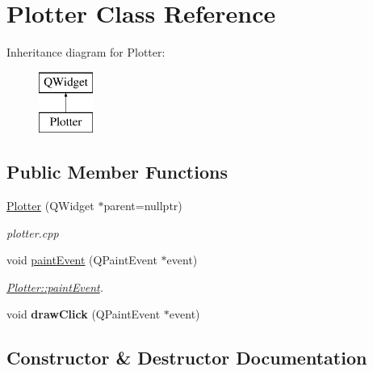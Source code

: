 \hypertarget{classPlotter}{}\section{Plotter Class Reference}
\label{classPlotter}
Inheritance diagram for Plotter\+:\begin{figure}[H]
\begin{center}
\leavevmode
\includegraphics[height=2.000000cm]{classPlotter}
\end{center}
\end{figure}
\subsection*{Public Member Functions}
\begin{DoxyCompactItemize}
\item 
\mbox{\hyperlink{classPlotter_a1807627530de30ae58dff3c42a823497}{Plotter}} (Q\+Widget $\ast$parent=nullptr)
\begin{DoxyCompactList}\small\item\em plotter.\+cpp \end{DoxyCompactList}\item 
void \mbox{\hyperlink{classPlotter_a06477bf987646f000a8982db1352a11d}{paint\+Event}} (Q\+Paint\+Event $\ast$event)
\begin{DoxyCompactList}\small\item\em \mbox{\hyperlink{classPlotter_a06477bf987646f000a8982db1352a11d}{Plotter\+::paint\+Event}}. \end{DoxyCompactList}\item 
\mbox{\label{classPlotter_a237062ad0a0bd6462afd77ff111122b5}} 
void {\bfseries draw\+Click} (Q\+Paint\+Event $\ast$event)
\end{DoxyCompactItemize}


\subsection{Constructor \& Destructor Documentation}
\mbox{\label{classPlotter_a1807627530de30ae58dff3c42a823497}} 
